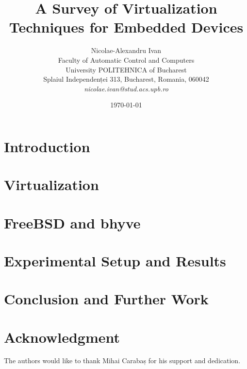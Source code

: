 \documentclass[12pt]{article}
\title{A Survey of Virtualization Techniques for Embedded Devices}
\author{Nicolae-Alexandru Ivan\\
Faculty of Automatic Control and Computers\\
University POLITEHNICA of Bucharest\\
Splaiul Independenței 313, Bucharest, Romania, 060042 \\
\emph{nicolae.ivan@stud.acs.upb.ro}}
\date{\today}
\begin{document}
\maketitle

\begin{abstract}

\end{abstract}

\section{Introduction}
\label{sec:introduction}


\section{Virtualization}
\label{sec:virtualization}


\section{FreeBSD and bhyve}
\label{sec:bhyve}


\section{Experimental Setup and Results}
\label{sec:setup}


\section{Conclusion and Further Work}
\label{sec:conclusion}


\section*{Acknowledgment}
\label{sec:acknowledgment}

The authors would like to thank Mihai Carabaș for his support and dedication.

\newpage
\nocite{*}



\end{document}
